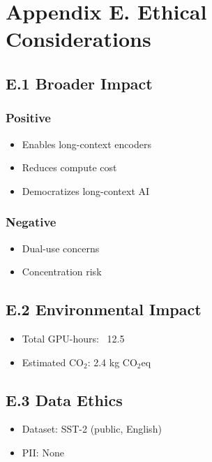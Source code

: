 
\section{Appendix E. Ethical Considerations}

\subsection{E.1 Broader Impact}

\subsubsection{Positive}
\begin{itemize}
\item Enables long-context encoders
\item Reduces compute cost
\item Democratizes long-context AI

\end{itemize}
\subsubsection{Negative}
\begin{itemize}
\item Dual-use concerns
\item Concentration risk

\end{itemize}
\subsection{E.2 Environmental Impact}

\begin{itemize}
\item Total GPU-hours: ~12.5
\item Estimated CO$_2$: 2.4 kg CO$_2$eq

\end{itemize}
\subsection{E.3 Data Ethics}

\begin{itemize}
\item Dataset: SST-2 (public, English)
\item PII: None

\end{itemize}

